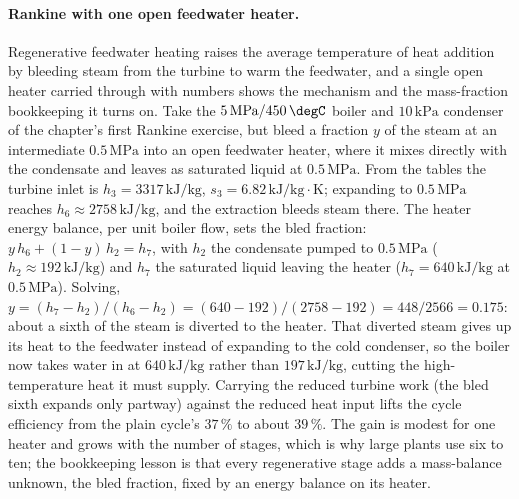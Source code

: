 \paragraph{Rankine with one open feedwater heater.} Regenerative feedwater
heating raises the average temperature of heat addition by bleeding steam from the
turbine to warm the feedwater, and a single open heater carried through with
numbers shows the mechanism and the mass-fraction bookkeeping it turns on. Take
the $5\,\text{MPa}/450\,\degC$ boiler and $10\,\text{kPa}$ condenser of the
chapter's first Rankine exercise, but bleed a fraction $y$ of the steam at an
intermediate $0.5\,\text{MPa}$ into an open feedwater heater, where it mixes
directly with the condensate and leaves as saturated liquid at $0.5\,\text{MPa}$.
From the tables the turbine inlet is $h_3 = 3317\,\text{kJ}/\text{kg}$,
$s_3 = 6.82\,\text{kJ}/\text{kg}\cdot\text{K}$; expanding to $0.5\,\text{MPa}$
reaches $h_6 \approx 2758\,\text{kJ}/\text{kg}$, and the extraction bleeds steam
there. The heater energy balance, per unit boiler flow, sets the bled fraction:
$y\,h_6 + (1 - y)\,h_2 = h_7$, with $h_2$ the condensate pumped to
$0.5\,\text{MPa}$ ($h_2 \approx 192\,\text{kJ}/\text{kg}$) and $h_7$ the
saturated liquid leaving the heater ($h_7 = 640\,\text{kJ}/\text{kg}$ at
$0.5\,\text{MPa}$). Solving, $y = (h_7 - h_2)/(h_6 - h_2) = (640 - 192)/(2758 -
192) = 448/2566 = 0.175$: about a sixth of the steam is diverted to the heater.
That diverted steam gives up its heat to the feedwater instead of expanding to the
cold condenser, so the boiler now takes water in at $640\,\text{kJ}/\text{kg}$
rather than $197\,\text{kJ}/\text{kg}$, cutting the high-temperature heat it must
supply. Carrying the reduced turbine work (the bled sixth expands only partway)
against the reduced heat input lifts the cycle efficiency from the plain cycle's
$37\,\%$ to about $39\,\%$. The gain is modest for one heater and grows with the
number of stages, which is why large plants use six to ten; the bookkeeping
lesson is that every regenerative stage adds a mass-balance unknown, the bled
fraction, fixed by an energy balance on its heater.

